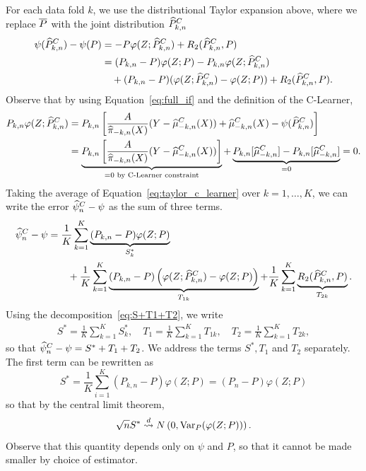 For each data fold $k$, we use the distributional Taylor expansion above, where we replace $\overline{P}$ with the joint distribution $\widehat{P}^C_{k,n}$
\begin{align}
\label{eq:taylor_c_learner}
\psi(\widehat{P}^C_{k,n}) - \psi(P) &= - P \varphi(Z;\widehat{P}^C_{k,n}) + R_2(\widehat{P}^C_{k,n},P) \nonumber\\ 
&= (P_{k,n}-P)\varphi(Z;P)\nonumber
-P_{k,n} \varphi(Z;\widehat{P}^C_{k,n})
\\&\quad  +(P_{k,n}-P)
(\varphi(Z;\widehat{P}^C_{k,n})-\varphi(Z;P))
+R_2(\widehat{P}^C_{k,n},P). 
\end{align}
Observe that by using Equation~\eqref{eq:full_if} and the definition of the C-Learner,
\begin{align*}
    P_{k,n}\varphi(Z;\widehat{P}^C_{k,n})
&=P_{k,n}\left[\frac{A}{\widehat{\pi}_{-k,n}(X)}(Y-\widehat{\mu}^C_{-k,n}(X))+\widehat{\mu}^C_{-k,n}(X)-\psi(\widehat{P}^C_{k,n})\right]
\\&=\underbrace{P_{k,n}\left[\frac{A}{\widehat{\pi}_{-k,n}(X)}(Y-\widehat{\mu}^C_{-k,n}(X))\right]}_{=0 \text{ by C-Learner constraint}}
+\underbrace{P_{k,n}[\widehat{\mu}^C_{-k,n}]-P_{k,n}[\widehat{\mu}^C_{-k,n}]}_{=0}=0.
\end{align*}
Taking the average of Equation~\eqref{eq:taylor_c_learner} over $k=1,\ldots,K$,
we can write the error $\widehat{\psi}^C_n-\psi$ as the sum of three terms.
    \begin{align}   
     \widehat{\psi}^C_{n} - \psi  
    & = \frac{1}{K}\sum_{k=1}^K\underbrace{(P_{k,n}-P)\varphi(Z;P)}_{S^*_k} \nonumber \\
    &  \qquad + \frac{1}{K}\sum_{k=1}^K\underbrace{(P_{k,n}-P) \left(\varphi(Z;\widehat{P}^C_{k,n})-\varphi(Z;P)\right)}_{T_{1k}} + \frac{1}{K}\sum_{k=1}^K\underbrace{R_2(\widehat{P}^C_{k,n},P)}_{T_{2k}}. \label{eq:S+T1+T2}
\end{align}
Using the decomposition~\eqref{eq:S+T1+T2}, we write 
\begin{align}
S^*=\frac{1}{K}\sum_{k=1}^K S^*_k,  \hspace{1em}
T_1=\frac{1}{K}\sum_{k=1}^K T_{1k},  \hspace{1em}
T_2=\frac{1}{K}\sum_{k=1}^K T_{2k},
\end{align}
so that
$\widehat{\psi}^C_{n} - \psi = S^* + T_1 + T_2$.
We address the terms $S^*,T_1$ and $T_2$ separately. The first term can be rewritten as
$$
S^* = \frac{1}{K}\sum_{i=1}^K (P_{k,n}-P)\varphi(Z;P) = (P_n-P)\varphi(Z;P)
$$
so that by the central limit theorem, 
$$
\sqrt{n}S^* \stackrel{d}{\rightsquigarrow} {N}\left(0, {\rm Var}_P(\varphi(Z;P))\right).
$$ 
Observe that this quantity depends only on $\psi$ and $P$, so that it cannot be made smaller by choice of estimator. 
